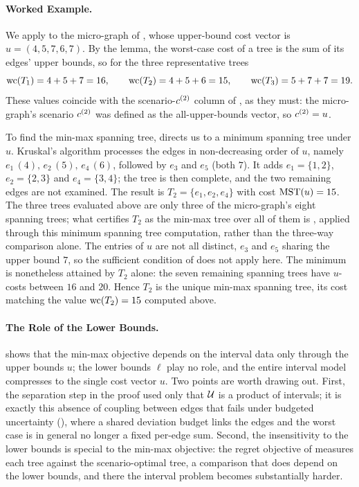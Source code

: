 \paragraph{Worked Example.}

We apply  to the micro-graph of , whose upper-bound cost vector is $u = (4, 5, 7, 6, 7)$.
By the lemma, the worst-case cost of a tree is the sum of its edges' upper bounds, so for the three representative trees
\[
\mathrm{wc}(T_1) = 4 + 5 + 7 = 16, \qquad
\mathrm{wc}(T_2) = 4 + 5 + 6 = 15, \qquad
\mathrm{wc}(T_3) = 5 + 7 + 7 = 19.
\]
These values coincide with the scenario-$c^{(2)}$ column of , as they must: the micro-graph's scenario $c^{(2)}$ was defined as the all-upper-bounds vector, so $c^{(2)} = u$.

To find the min-max spanning tree,  directs us to a minimum spanning tree under $u$.
Kruskal's algorithm processes the edges in non-decreasing order of $u$, namely $e_1\,(4),\, e_2\,(5),\, e_4\,(6)$, followed by $e_3$ and $e_5$ (both $7$).
It adds $e_1 = \{1,2\}$, $e_2 = \{2,3\}$ and $e_4 = \{3,4\}$; the tree is then complete, and the two remaining edges are not examined.
The result is $T_2 = \{e_1, e_2, e_4\}$ with cost $\mathrm{MST}(u) = 15$.
The three trees evaluated above are only three of the micro-graph's eight spanning trees; what certifies $T_2$ as the min-max tree over all of them is , applied through this minimum spanning tree computation, rather than the three-way comparison alone.
The entries of $u$ are not all distinct, $e_3$ and $e_5$ sharing the upper bound $7$, so the sufficient condition of  does not apply here.
The minimum is nonetheless attained by $T_2$ alone: the seven remaining spanning trees have $u$-costs between $16$ and $20$.
Hence $T_2$ is the unique min-max spanning tree, its cost matching the value $\mathrm{wc}(T_2) = 15$ computed above.

\paragraph{The Role of the Lower Bounds.}

 shows that the min-max objective depends on the interval data only through the upper bounds $u$; the lower bounds $\ell$ play no role, and the entire interval model compresses to the single cost vector $u$.
Two points are worth drawing out.
First, the separation step in the proof used only that $\mathcal{U}$ is a product of intervals; it is exactly this absence of coupling between edges that fails under budgeted uncertainty (), where a shared deviation budget links the edges and the worst case is in general no longer a fixed per-edge sum.
Second, the insensitivity to the lower bounds is special to the min-max objective: the regret objective of  measures each tree against the scenario-optimal tree, a comparison that does depend on the lower bounds, and there the interval problem becomes substantially harder.

